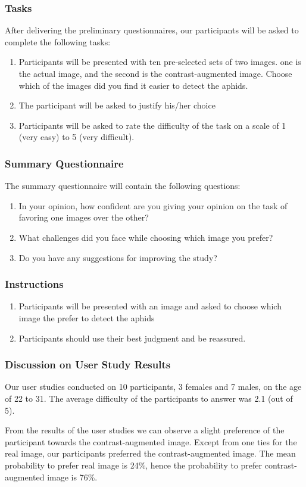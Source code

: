 \documentclass{article}
\begin{document}
\subsubsection{Tasks}
After delivering the preliminary questionnaires, our participants will be asked to complete the following tasks:

\begin{enumerate}
    \item Participants will be presented with ten pre-selected sets of two images. one is the actual image, and the second is the contrast-augmented image.
    Choose which of the images did you find it easier to detect the aphids.
    \item The participant will be asked to justify his/her choice
    \item Participants will be asked to rate the difficulty of the task on a scale of 1 (very easy) to 5 (very difficult).
\end{enumerate}

\subsubsection{Summary Questionnaire}
The summary questionnaire will contain the following questions: 

\begin{enumerate}
    \item In your opinion, how confident are you giving your opinion on the task of favoring one
    images over the other?    
    \item What challenges did you face while choosing which image you prefer?
    \item Do you have any suggestions for improving the study?
\end{enumerate}

\subsubsection{Instructions}
\begin{enumerate}
    \item Participants will be presented with an image and asked to choose which image the prefer to detect the aphids
    \item Participants should use their best judgment and be reassured.
\end{enumerate}

\subsubsection{Discussion on User Study Results}
Our user studies conducted on 10 participants, 3 females and 7 males, on the age of 22 to 31.
The average difficulty of the participants to answer was 2.1 (out of 5).

From the results of the user studies we can observe a slight preference of the participant
towards the contrast-augmented image. Except from one ties for the real image, our participants
preferred the contrast-augmented image. The mean probability to prefer real image is
24\%, hence the probability to prefer contrast-augmented image is 76\%.

\newpage


\end{document}

